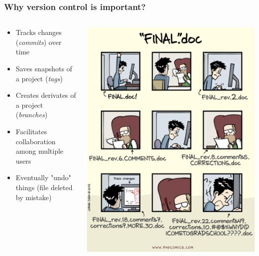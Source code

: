 \documentclass[svgnames]{beamer}
\begin{document}
\begin{frame}
    \frametitle{Why version control is important?}
    \begin{columns}[c]
    		\begin{column}{0.5\linewidth}
			\begin{itemize}
				\item Tracks changes (\emph{commits}) over time 
				\item Saves snapshots of a project (\emph{tags})
				\item Creates derivates of a project (\emph{branches})
				\item Facilitates collaboration among multiple users
				\item Eventually "undo" things (file deleted by mistake)
			\end{itemize}
    		\end{column}
    		\begin{column}{0.5\linewidth}
        			\includegraphics[width=\linewidth]{img/phd_comics.png}
    		\end{column}
    \end{columns}
\end{frame}
\end{document}
